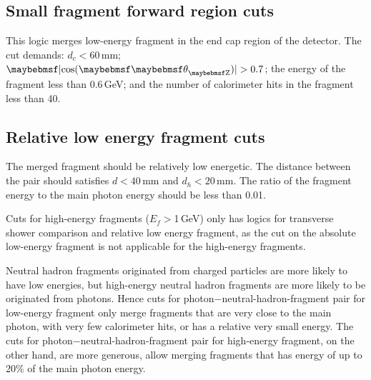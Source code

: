 \subsection{Small fragment forward region cuts}

This logic merges low-energy fragment in the  end cap region of the detector. The cut demands: $d_c < 60$\,mm; $\absCosTheta > 0.7$; the energy of the fragment less than 0.6\,GeV; and the number of calorimeter hits in the fragment less than 40.

\subsection{Relative low energy fragment cuts}

The merged fragment should be relatively low energetic. The distance between the pair should satisfies $d < 40$\,mm and $d_h < 20$\,mm. The ratio of the fragment energy  to the main photon energy should be less than 0.01.







Cuts for high-energy fragments ($E_f>$1\,GeV) only has logics for transverse shower comparison and relative low energy fragment, as the cut on the absolute low-energy fragment is not applicable for the  high-energy fragments.

Neutral hadron fragments originated from charged particles are more likely to have low energies, but high-energy neutral hadron fragments are more likely to be originated from photons. Hence cuts for photon$-$neutral-hadron-fragment pair for low-energy fragment only merge fragments that are very close to the main photon, with very few calorimeter hits, or has a relative very small energy. The cuts for photon$-$neutral-hadron-fragment pair for high-energy fragment, on the other hand, are more generous, allow merging fragments that has energy of up to 20\% of the main photon energy.


